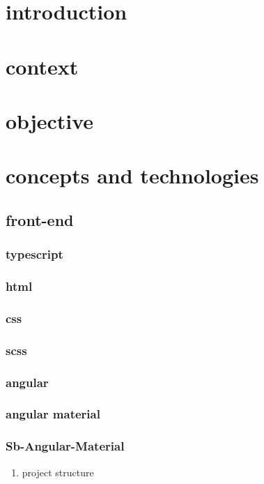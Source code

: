 \documentclass[11pt]{article}
\author{Hydrocat}
\date{\today}
\title{}
\begin{document}
\tableofcontents

\section{introduction}
\label{sec:org32e20e9}
\section{context}
\label{sec:orgb8c51e0}
\section{objective}
\label{sec:org037caff}


\section{concepts and technologies}
\label{sec:org67f345d}
\subsection{front-end}
\label{sec:orgb150df8}
\subsubsection{typescript}
\label{sec:orgc7c6068}
\subsubsection{html}
\label{sec:orgfa56c94}
\subsubsection{css}
\label{sec:orge07e307}
\subsubsection{scss}
\label{sec:orgb68c22b}
\subsubsection{angular}
\label{sec:orgbaaba99}
\subsubsection{angular material}
\label{sec:orge11821a}
\subsubsection{Sb-Angular-Material}
\label{sec:org5003370}
\begin{enumerate}
\item project structure
\label{sec:org74cd683}
\end{enumerate}
\end{document}
